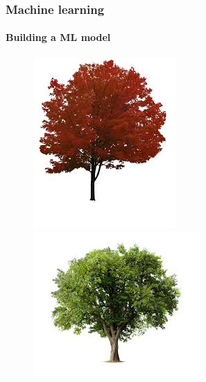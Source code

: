 \documentclass[aspectratio=43]{beamer}
\begin{document}
\begin{frame}

	\frametitle{Machine learning}
	\framesubtitle{Building a ML model}
	
	\begin{figure}
		\includegraphics[width = \linewidth]{tree2.jpeg}
		\endminipage\hfill
		\includegraphics[width = \linewidth]{tree1.jpeg}

\end{figure}
\end{frame}
\end{document}

